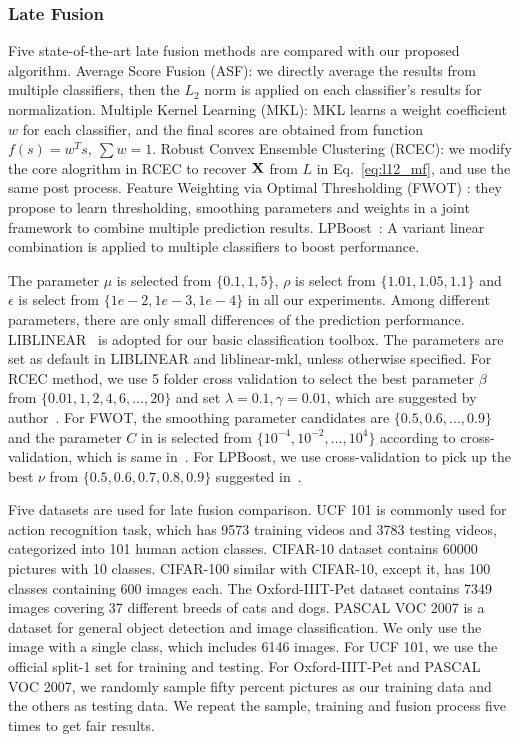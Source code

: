 \documentclass[letterpaper]{article} %
\def\bX{{\bf X}}
\def\bX{{\bf X}}
\begin{document}
\subsubsection{Late Fusion}
Five state-of-the-art late fusion methods are compared with our proposed algorithm.
Average Score Fusion (ASF): we directly average the results from multiple classifiers, then the $L_2$ norm is applied on each classifier's results for normalization.
Multiple Kernel Learning (MKL): MKL learns a weight coefficient $w$ for each classifier, and the final scores are obtained from function $f(s)=w^{T}s,~\sum w = 1$.
Robust Convex Ensemble Clustering (RCEC)\cite{gaoijcai2016robust}: we modify the core alogrithm in RCEC to recover $\bX$ from $L$ in Eq.~\ref{eq:l12_mf}, and use the same post process.
Feature Weighting via Optimal Thresholding (FWOT) \cite{xuiccv2013feature}: they propose to learn thresholding, smoothing parameters and weights in a joint framework to combine multiple prediction results.
LPBoost~\cite{gehler2009feature}: A variant linear combination is applied to multiple classifiers to boost performance.

The parameter $\mu$ is selected from $\{0.1, 1, 5\}$,
$\rho$ is select from $\{1.01, 1.05, 1.1\}$
and $\epsilon$ is select from $\{1e-2, 1e-3, 1e-4\}$ in all our experiments.
Among different parameters, there are only small differences of the prediction performance.
LIBLINEAR~\cite{fan2008liblinear} is adopted for our basic classification toolbox.
The parameters are set as default in LIBLINEAR and liblinear-mkl, unless otherwise specified.
For RCEC method, we use 5 folder cross validation to select the best parameter $\beta$ from $\{0.01,1,2,4,6,...,20\}$ and set $\lambda = 0.1, \gamma = 0.01$, which are suggested by author~\cite{yiicdm2012robust}.
For FWOT, the smoothing parameter candidates are $\{0.5, 0.6, ... , 0.9\}$ and the parameter $C$ in is selected from $\{10^{-4},10^{-2},...,10^{4}\}$ according to cross-validation, which is same in~\cite{xuiccv2013feature}.
For LPBoost, we use cross-validation to pick up the best $\nu$ from $\{0.5,0.6,0.7,0.8,0.9\}$ suggested in~\cite{xuiccv2013feature}.


Five datasets are used for late fusion comparison.
UCF 101 is commonly used for action recognition task, which has 9573 training videos and 3783 testing videos, categorized into 101 human action classes.
CIFAR-10 dataset contains 60000 pictures with 10 classes.
CIFAR-100 similar with CIFAR-10, except it, has 100 classes containing 600 images each.
The Oxford-IIIT-Pet dataset contains 7349 images covering 37 different breeds of cats and dogs.
PASCAL VOC 2007 is a dataset for general object detection and image classification.
We only use the image with a single class, which includes 6146 images.
For UCF 101, we use the official split-1 set for training and testing.
For Oxford-IIIT-Pet and PASCAL VOC 2007, we randomly sample fifty percent pictures as our training data and the others as testing data.
We repeat the sample, training and fusion process five times to get fair results.
\end{document}
